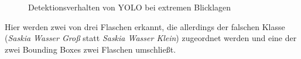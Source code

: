 \begin{figure}[H]
	\centering
	\hspace{2cm}
	\caption{Detektionsverhalten von YOLO bei extremen Blicklagen}
	\label{lagen_yolo}
\end{figure}

Hier werden zwei von drei Flaschen erkannt, die allerdings der falschen Klasse (\textit{Saskia Wasser Groß} statt \textit{Saskia Wasser Klein}) zugeordnet werden und eine der zwei Bounding Boxes zwei Flaschen umschließt.

